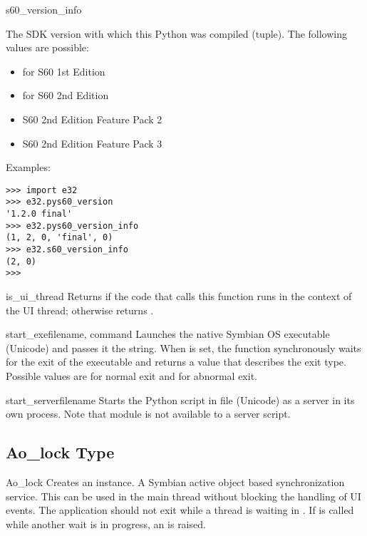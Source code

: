 \begin{datadesc}{s60_version_info}

The SDK version with which this Python was compiled (tuple). The following 
values are possible:

\begin{itemize}
\item {} for S60 1st Edition
\item {} for S60 2nd Edition
\item {} S60 2nd Edition Feature Pack 2
\item {} S60 2nd Edition Feature Pack 3
\end{itemize}

Examples:
\begin{verbatim}
>>> import e32
>>> e32.pys60_version
'1.2.0 final'
>>> e32.pys60_version_info
(1, 2, 0, 'final', 0)
>>> e32.s60_version_info
(2, 0)
>>>
\end{verbatim}
\end{datadesc}

\begin{funcdesc}{is_ui_thread}{}
Returns  if the code that calls this function runs in the 
context of the UI thread; otherwise returns .
\end{funcdesc}

\begin{funcdesc}{start_exe}{filename, command }
Launches the native Symbian OS executable  
(Unicode) and passes it the  string. When 
 is set, the function synchronously waits for the exit 
of the executable and returns a value that describes the exit type. Possible 
values are  for normal exit and  for abnormal exit.
\end{funcdesc}

\begin{funcdesc}{start_server}{filename}
Starts the Python script in file  (Unicode) as a 
server in its own process. Note that  module is not 
available to a server script.
\end{funcdesc}

\subsection{Ao_lock Type}
\label{subsec:Aolock}

\begin{classdesc}{Ao_lock}{}
Creates an  instance. A Symbian active object based 
synchronization service. This can be used in the main thread without 
blocking the handling of UI events. The application should not exit while a 
thread is waiting in . If  is called 
while another wait is in progress, an  is raised.
\end{classdesc}

